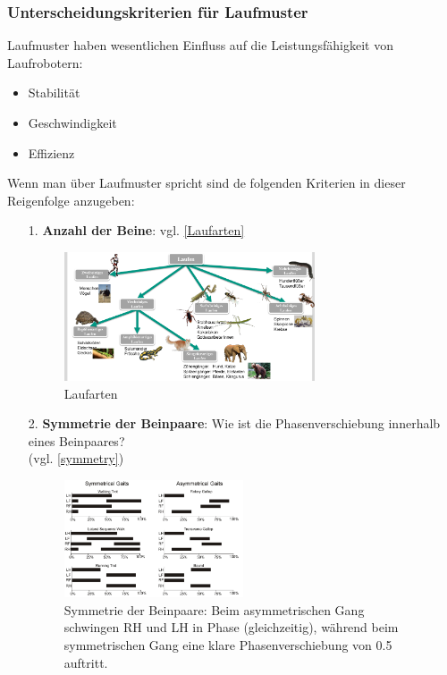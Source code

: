 \subsubsection{Unterscheidungskriterien für Laufmuster}
Laufmuster haben wesentlichen Einfluss auf die Leistungsfähigkeit von Laufrobotern:
\begin{itemize}
\item Stabilität
\item Geschwindigkeit
\item Effizienz
\end{itemize}
Wenn man über Laufmuster spricht sind de folgenden Kriterien in dieser Reigenfolge anzugeben:
\begin{itemize}
\item[1.] \textbf{Anzahl der Beine}: vgl. \autoref{Laufarten}
\begin{figure}[h!]
	\centering
	\includegraphics[width=0.7\textwidth]{figures/ch06_beinanzahl.png}
	\caption{Laufarten}
	\label{Laufarten}
\end{figure}
\item[2.] \textbf{Symmetrie der Beinpaare}: Wie ist die Phasenverschiebung innerhalb eines Beinpaares?\\(vgl. \autoref{symmetry})
\begin{figure}[h!]
	\centering
	\includegraphics[width=0.5\textwidth]{figures/ch06_symmetry.png}
	\caption{Symmetrie der Beinpaare: Beim asymmetrischen Gang schwingen RH und LH in Phase (gleichzeitig), während beim symmetrischen Gang eine klare Phasenverschiebung von 0.5 auftritt.}
	\label{symmetry}
\end{figure}

\end{itemize}
